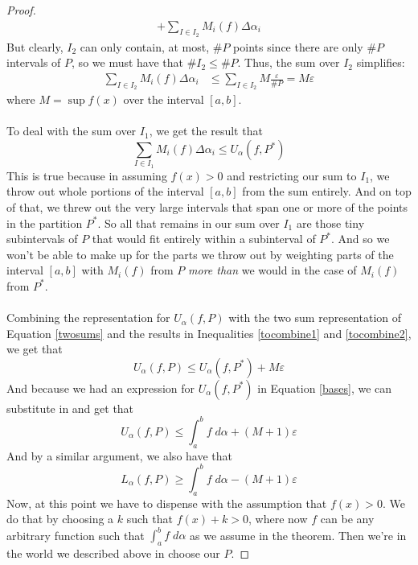 \documentclass[12pt]{article}
\theoremstyle{plain}
\theoremstyle{definition}
\theoremstyle{remark}
\begin{document}
\begin{proof}
\begin{align}
         + \sum_{I\in I_2} M_i(f) \Delta\alpha_i
         \label{twosums}
\end{align}
But clearly, $I_2$ can only contain, at most, $\#P$ points since there are only $\#P$ intervals of $P$, so we must have that $\#I_2 \leq \#P$. Thus, the sum over $I_2$ simplifies:
\begin{align}
        \sum_{I\in I_2} M_i(f) \Delta\alpha_i 
        &\leq \sum_{I\in I_2} M \frac{\varepsilon}{\#P} =    
            M\varepsilon
        \label{tocombine1}
\end{align}
where $M = \sup f(x)$ over the interval $[a,b]$.
\\
\\
To deal with the sum over $I_1$, we get the result that 
\begin{equation}
    \label{tocombine2}
    \sum_{I\in I_1} M_i(f) \Delta\alpha_i  \leq U_\alpha(f,P^*)
\end{equation}
This is true because in assuming $f(x)>0$ and restricting our sum to $I_1$, we throw out whole portions of the interval $[a,b]$ from the sum entirely. And on top of that, we threw out the very large intervals that span one or more of the points in the partition $P^*$.  So all that remains in our sum over $I_1$ are those tiny subintervals of $P$ that would fit entirely within a subinterval of $P^*$. And so we won't be able to make up for the parts we throw out by weighting parts of the interval $[a,b]$ with $M_i(f)$ from $P$ \emph{more than} we would in the case of $M_i(f)$ from $P^*$.
\\
\\
Combining the representation for $U_\alpha(f,P)$ with the two sum representation of Equation \ref{twosums} and the results in Inequalities \ref{tocombine1} and \ref{tocombine2}, we get that
\begin{equation}
    U_\alpha(f,P) \leq U_\alpha(f,P^*) + M\varepsilon
\end{equation}
And because we had an expression for $U_\alpha(f,P^*)$ in Equation \ref{bases}, we can substitute in and get that
\begin{equation}
    \label{ass1}
    U_\alpha(f,P) \leq \int^b_a f\;d\alpha  + (M+1)\varepsilon
\end{equation}
And by a similar argument, we also have that 
\begin{equation}
    \label{ass2}
    L_\alpha(f,P) \geq \int^b_a f\;d\alpha  - (M+1)\varepsilon
\end{equation}
Now, at this point we have to dispense with the assumption that $f(x)>0$.  We do that by choosing a $k$ such that $f(x) + k >0$, where now $f$ can be any arbitrary function such that $\int^b_a f\;d\alpha$ as we assume in the theorem.  Then we're in the world we described above in choose our $P$. 

\end{proof}
\end{document}
